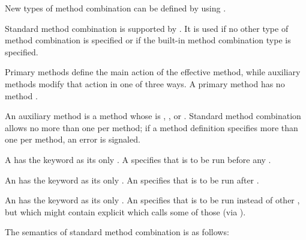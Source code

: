 New types of method combination can be defined by using 
. 

\endsubsubsubsection%

\endsubsubsection%

                                                       
Standard method combination is supported by .
It is used if no other type of method
combination is specified or if the built-in method combination type
 is specified. 

Primary methods define the main action of the effective method,  
while auxiliary methods modify that action in one of three ways.
A primary method has no method .
                                                           
An auxiliary method is a method whose 
 is , , or .
Standard method combination
allows no more than one  per method; if a method definition
specifies more than one  per method, an error is signaled.

\beginlist

\itemitem{\bull}
A  has the keyword  as its only .
A  specifies  that is to be run before any 
.

\itemitem{\bull}
An  has the keyword  as its only .
An  specifies  that is to be run after
.

\itemitem{\bull}
An  has the keyword  as its only .
An  specifies  that is to be run instead of other
,
but which might contain explicit 
which calls some of those  
(via ).

\endlist

The semantics of standard method combination is as follows:

